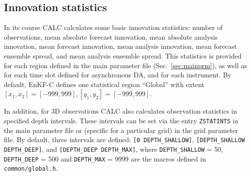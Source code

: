 \documentclass[11pt]{report}
\begin{document}
\subsection{Innovation statistics}

In its course CALC calculates some basic innovation statistics: number of observations, mean absolute forecast innovation, mean absolute analysis innovation, mean forecast innovation, mean analysis innovation, mean forecast ensemble spread, and mean analysis ensemble spread.
This statistics is provided for each region defined in the main parameter file (Sec.~\ref{sec:mainprm}), as well as for each time slot defined for asynchronous DA, and for each instrument.
By default, EnKF-C defines one statistical region ``Global'' with extent $[x_1,x_2] = [-999,999], [y_1,y_2] = [-999,999]$.

In addition, for 3D observations CALC also calculates observation statistics in specified depth intervals.
These intervals can be set via the entry \verb|ZSTATINTS| in the main parameter file or (specific for a particular grid) in the grid parameter file.
By default, three intervals are defined: \verb|[0 DEPTH_SHALLOW]|, \verb|[DEPTH_SHALLOW DEPTH_DEEP]|, and \verb|[DEPTH_DEEP DEPTH_MAX]|, where \verb|DEPTH_SHALLOW| = 50, \verb|DEPTH_DEEP| = 500 and \verb|DEPTH_MAX| = 9999 are the macros defined in \verb|common/global.h|.
\end{document}
